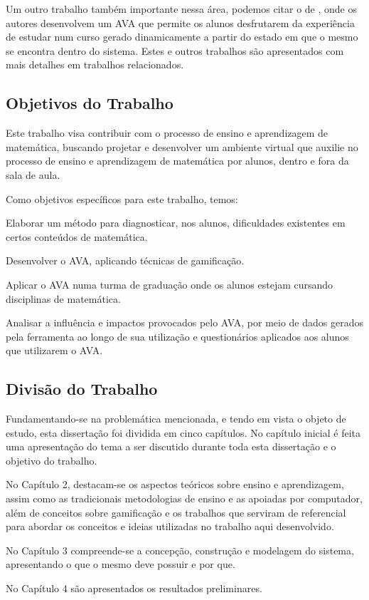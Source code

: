 Um outro trabalho também  importante nessa área, podemos citar o de  , onde os autores desenvolvem um AVA que permite os alunos desfrutarem da experiência de estudar num curso gerado dinamicamente a partir do estado em que o mesmo se encontra dentro do sistema. Estes e outros trabalhos são apresentados com mais detalhes em trabalhos relacionados.

\subsection{Objetivos do Trabalho}

Este trabalho visa contribuir com o processo de ensino e aprendizagem de matemática, buscando projetar e desenvolver um ambiente virtual que auxilie no processo de ensino e aprendizagem de matemática por alunos, dentro e fora da sala de aula. 

Como objetivos específicos para este trabalho, temos: 
\begin{alineascomponto}
    \item Elaborar um método para diagnosticar, nos alunos, dificuldades existentes em certos conteúdos de matemática.
	\item Desenvolver o AVA, aplicando técnicas de gamificação.
    \item Aplicar o AVA numa turma de graduação onde os alunos estejam cursando disciplinas de matemática.
    \item Analisar a influência e impactos provocados pelo AVA, por meio de dados gerados pela ferramenta ao longo de sua utilização e questionários aplicados aos alunos que utilizarem o AVA.

\end{alineascomponto}


\subsection{Divisão do Trabalho}

Fundamentando-se na problemática mencionada, e tendo em vista o objeto de estudo, esta dissertação foi dividida em cinco capítulos. No capítulo inicial é feita uma apresentação do tema a ser discutido durante toda esta dissertação e o objetivo do trabalho.

No Capítulo 2, destacam-se os aspectos teóricos sobre ensino e aprendizagem, assim como as tradicionais metodologias de ensino e as apoiadas por computador, além de conceitos sobre gamificação e os trabalhos que serviram de referencial para abordar os conceitos e ideias utilizadas no trabalho aqui desenvolvido.

No Capítulo 3 compreende-se a concepção, construção e modelagem do sistema, apresentando o que o mesmo deve possuir e por que.

No Capítulo 4 são apresentados os resultados preliminares.